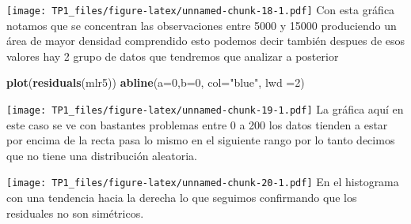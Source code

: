 \documentclass[
]{article}
\newenvironment{Shaded}{\begin{snugshade}}{\end{snugshade}}
\newcommand{\DataTypeTok}[1]{\textcolor[rgb]{0.13,0.29,0.53}{#1}}
\newcommand{\DecValTok}[1]{\textcolor[rgb]{0.00,0.00,0.81}{#1}}
\newcommand{\KeywordTok}[1]{\textcolor[rgb]{0.13,0.29,0.53}{\textbf{#1}}}
\newcommand{\NormalTok}[1]{#1}
\newcommand{\OperatorTok}[1]{\textcolor[rgb]{0.81,0.36,0.00}{\textbf{#1}}}
\newcommand{\StringTok}[1]{\textcolor[rgb]{0.31,0.60,0.02}{#1}}
\begin{document}
\texttt{[image: TP1\_files/figure-latex/unnamed-chunk-18-1.pdf]} Con esta
gráfica notamos que se concentran las observaciones entre 5000 y 15000
produciendo un área de mayor densidad comprendido esto podemos decir
también despues de esos valores hay 2 grupo de datos que tendremos que
analizar a posterior

\begin{Shaded}
\begin{Highlighting}[]
\KeywordTok{plot}\NormalTok{(}\KeywordTok{residuals}\NormalTok{(mlr5))}
\KeywordTok{abline}\NormalTok{(}\DataTypeTok{a=}\DecValTok{0}\NormalTok{,}\DataTypeTok{b=}\DecValTok{0}\NormalTok{, }\DataTypeTok{col=}\StringTok{"blue"}\NormalTok{, }\DataTypeTok{lwd =}\DecValTok{2}\NormalTok{)}
\end{Highlighting}
\end{Shaded}

\texttt{[image: TP1\_files/figure-latex/unnamed-chunk-19-1.pdf]} La
gráfica aquí en este caso se ve con bastantes problemas entre 0 a 200
los datos tienden a estar por encima de la recta pasa lo mismo en el
siguiente rango por lo tanto decimos que no tiene una distribución
aleatoria.

\begin{Shaded}
\end{Shaded}

\texttt{[image: TP1\_files/figure-latex/unnamed-chunk-20-1.pdf]} En el
histograma con una tendencia hacia la derecha lo que seguimos
confirmando que los residuales no son simétricos.

\begin{Shaded}
\end{Shaded}
\end{document}
